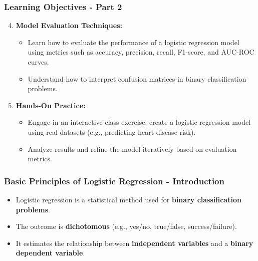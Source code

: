 \documentclass[aspectratio=169]{beamer}
\begin{document}
\begin{frame}[fragile]
    \frametitle{Learning Objectives - Part 2}
    \begin{enumerate}
        \setcounter{enumi}{3}
        \item \textbf{Model Evaluation Techniques:}
        \begin{itemize}
            \item Learn how to evaluate the performance of a logistic regression model using metrics such as accuracy, precision, recall, F1-score, and AUC-ROC curves.
            \item Understand how to interpret confusion matrices in binary classification problems.
        \end{itemize}
        
        \item \textbf{Hands-On Practice:}
        \begin{itemize}
            \item Engage in an interactive class exercise: create a logistic regression model using real datasets (e.g., predicting heart disease risk).
            \item Analyze results and refine the model iteratively based on evaluation metrics.
        \end{itemize}
    \end{enumerate}
\end{frame}

\begin{frame}[fragile]
    \frametitle{Basic Principles of Logistic Regression - Introduction}
    \begin{itemize}
        \item Logistic regression is a statistical method used for \textbf{binary classification problems}.
        \item The outcome is \textbf{dichotomous} (e.g., yes/no, true/false, success/failure).
        \item It estimates the relationship between \textbf{independent variables} and a \textbf{binary dependent variable}.
    \end{itemize}
\end{frame}
\end{document}
